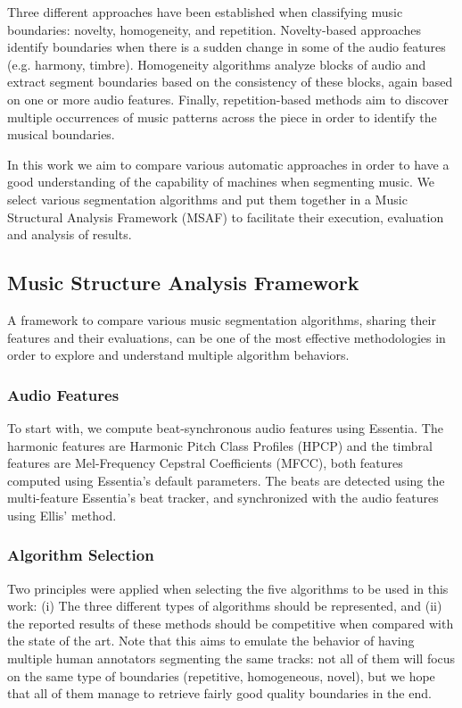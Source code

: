 \documentclass{article}
\begin{document}
Three different approaches have been established when classifying music boundaries: novelty, homogeneity, and repetition\cite{Paulus2010}. 
Novelty-based approaches identify boundaries when there is a sudden change in some of the audio features (e.g. harmony, timbre).
Homogeneity algorithms analyze blocks of audio and extract segment boundaries based on the consistency of these blocks, again based on one or more audio features.
Finally, repetition-based methods aim to discover multiple occurrences of music patterns across the piece in order to identify the musical boundaries.

In this work we aim to compare various automatic approaches in order to have a good understanding of the capability of machines when segmenting music.
We select various segmentation algorithms and put them together in a Music Structural Analysis Framework (MSAF) to facilitate their execution, evaluation and analysis of results.

\subsection{Music Structure Analysis Framework}

A framework to compare various music segmentation algorithms, sharing their features and their evaluations, can be one of the most effective methodologies in order to explore and understand multiple algorithm behaviors.

\subsubsection{Audio Features}

To start with, we compute beat-synchronous audio features using Essentia\cite{Bogdanov2013}.
The harmonic features are Harmonic Pitch Class Profiles (HPCP) and the timbral features are Mel-Frequency Cepstral Coefficients (MFCC), both features computed using Essentia's default parameters.
The beats are detected using the multi-feature Essentia's beat tracker, and synchronized with the audio features using Ellis' method\cite{Ellis2007}.

\subsubsection{Algorithm Selection}

Two principles were applied when selecting the five algorithms to be used in this work: (i) The three different types of algorithms should be represented, and (ii) the reported results of these methods should be competitive when compared with the state of the art.
Note that this aims to emulate the behavior of having multiple human annotators segmenting the same tracks: not all of them will focus on the same type of boundaries (repetitive, homogeneous, novel), but we hope that all of them manage to retrieve fairly good quality boundaries in the end.
\end{document}
